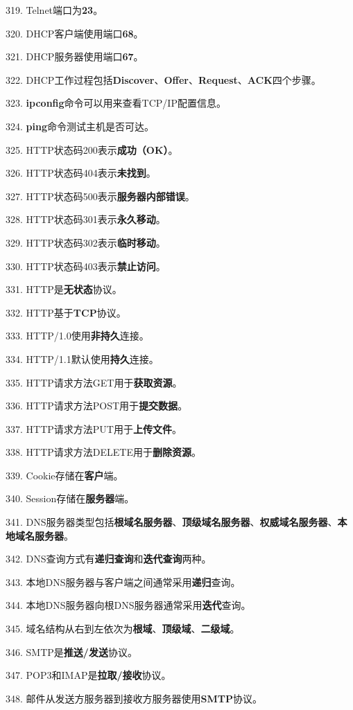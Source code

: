 \documentclass[12pt,a4paper,openany]{ctexbook}
\begin{document}
319. Telnet端口为\textbf{23}。

320. DHCP客户端使用端口\textbf{68}。

321. DHCP服务器使用端口\textbf{67}。

322. DHCP工作过程包括\textbf{Discover}、\textbf{Offer}、\textbf{Request}、\textbf{ACK}四个步骤。

323. \textbf{ipconfig}命令可以用来查看TCP/IP配置信息。

324. \textbf{ping}命令测试主机是否可达。

325. HTTP状态码200表示\textbf{成功（OK）}。

326. HTTP状态码404表示\textbf{未找到}。

327. HTTP状态码500表示\textbf{服务器内部错误}。

328. HTTP状态码301表示\textbf{永久移动}。

329. HTTP状态码302表示\textbf{临时移动}。

330. HTTP状态码403表示\textbf{禁止访问}。

331. HTTP是\textbf{无状态}协议。

332. HTTP基于\textbf{TCP}协议。

333. HTTP/1.0使用\textbf{非持久}连接。

334. HTTP/1.1默认使用\textbf{持久}连接。

335. HTTP请求方法GET用于\textbf{获取资源}。

336. HTTP请求方法POST用于\textbf{提交数据}。

337. HTTP请求方法PUT用于\textbf{上传文件}。

338. HTTP请求方法DELETE用于\textbf{删除资源}。

339. Cookie存储在\textbf{客户}端。

340. Session存储在\textbf{服务器}端。

341. DNS服务器类型包括\textbf{根域名服务器}、\textbf{顶级域名服务器}、\textbf{权威域名服务器}、\textbf{本地域名服务器}。

342. DNS查询方式有\textbf{递归查询}和\textbf{迭代查询}两种。

343. 本地DNS服务器与客户端之间通常采用\textbf{递归}查询。

344. 本地DNS服务器向根DNS服务器通常采用\textbf{迭代}查询。

345. 域名结构从右到左依次为\textbf{根域}、\textbf{顶级域}、\textbf{二级域}。

346. SMTP是\textbf{推送/发送}协议。

347. POP3和IMAP是\textbf{拉取/接收}协议。

348. 邮件从发送方服务器到接收方服务器使用\textbf{SMTP}协议。
\end{document}
